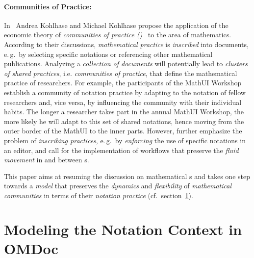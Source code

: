 \documentclass[a4paper]{article}
\begin{document}
\paragraph{Communities of Practice:}
In~\cite{KohKoh:copmem06} Andrea Kohlhase and Michael Kohlhase propose the application of
the economic theory of {\emph{communities of practice ({\cop})}}~\cite{Wen05} to the area
of mathematics. According to their discussions, {\emph{mathematical practice}} is
{\emph{inscribed}} into documents, e.\,g.\ by selecting specific notations or referencing
other mathematical publications. Analyzing a {\emph{collection of documents}} will
potentially lead to {\emph{clusters of shared practices}}, i.e. {\emph{communities of
    practice}}, that define the mathematical practice of researchers. For example, the
participants of the MathUI Workshop establish a community of notation practice by adapting
to the notation of fellow researchers and, vice versa, by influencing the community with
their individual habits. The longer a researcher takes part in the annual MathUI Workshop,
the more likely he will adapt to this set of shared notations, hence moving from the outer
border of the MathUI {\cop} to the inner parts. However, \cite{KohKoh:copmem06} further
emphasize the problem of {\emph{inscribing practices}}, e.\,g.\ by {\emph{enforcing}} the
use of specific notations in an editor, and call for the implementation of workflows that
preserve the {\emph{fluid movement}} in and between {\cop}s.

This paper aims at resuming the discussion on mathematical {\cop}s and takes one step
towards a {\emph{{\cop} model}} that preserves the {\emph{dynamics}} and
{\emph{flexibility}} of {\emph{mathematical communities}} in terms of their
{\emph{notation practice}} (cf.\ section~\ref{sec:docmodel}).


\section{Modeling the Notation Context in OMDoc}\label{sec:docmodel}
\end{document}
